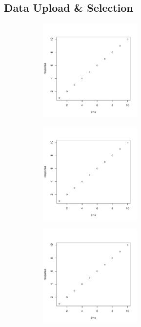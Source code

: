\documentclass[12pt]{article}
\begin{document}
\subsection{Data Upload \& Selection}
\label{subsec:SubSecUpload}

\begin{figure}
	\centering
	\begin{subfigure}[b]{0.45\textwidth}
		\includegraphics[width=\textwidth, height = 2in]{fig1.pdf}
		\subcaption{}
		\label{fig:FigUpload}
	\end{subfigure}	\hfill	
	\begin{subfigure}[b]{0.45\textwidth}
		\includegraphics[width=\textwidth, height = 2in]{fig1.pdf}
		\subcaption{}
		\label{fig:FigSample}
	\end{subfigure}
	\begin{subfigure}[b]{0.45\textwidth}
		\includegraphics[width=\textwidth, height = 2in]{fig1.pdf}
		\subcaption{}
		\label{fig:FigOutliers}
	\end{subfigure}\hfill

\end{figure}
\end{document}
